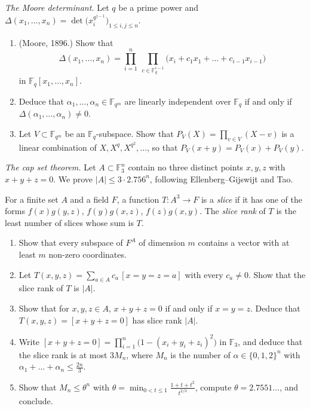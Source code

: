 \begin{exercise}[$\star\star$]\label{pb:moore}
\emph{The Moore determinant.} Let $q$ be a prime power and $\Delta(x_1,\dots,x_n)=\det\bigl(x_i^{q^{j-1}}\bigr)_{1\le i,j\le n}$.
\begin{enumerate}[label=(\alph*)]
\item (Moore, 1896.) Show that
\[
\Delta(x_1,\dots,x_n)=\prod_{i=1}^n\ \prod_{c\in\mathbb F_q^{i-1}}\bigl(x_i+c_1x_1+\dots+c_{i-1}x_{i-1}\bigr)
\]
in $\mathbb F_q[x_1,\dots,x_n]$.
\item Deduce that $\alpha_1,\dots,\alpha_n\in\mathbb F_{q^m}$ are linearly independent over $\mathbb F_q$ if and only if
$\Delta(\alpha_1,\dots,\alpha_n)\ne0$.
\item Let $V\subset\mathbb F_{q^m}$ be an $\mathbb F_q$-subspace. Show that $P_V(X)=\prod_{v\in V}(X-v)$ is a linear combination
of $X,X^q,X^{q^2},\dots$, so that $P_V(x+y)=P_V(x)+P_V(y)$.
\end{enumerate}
\end{exercise}

\begin{exercise}[Journey]\label{pb:capset}
\emph{The cap set theorem.} Let $A\subset\mathbb F_3^n$ contain no three distinct points $x,y,z$ with $x+y+z=0$. We prove
$|A|\le3\cdot2.756^n$, following Ellenberg--Gijswijt and Tao.

For a finite set $A$ and a field $F$, a function $T:A^3\to F$ is a \emph{slice} if it has one of the forms $f(x)g(y,z)$,
$f(y)g(x,z)$, $f(z)g(x,y)$. The \emph{slice rank} of $T$ is the least number of slices whose sum is $T$.
\begin{enumerate}[label=(\alph*)]
\item Show that every subspace of $F^A$ of dimension $m$ contains a vector with at least $m$ non-zero coordinates.
\item Let $T(x,y,z)=\sum_{a\in A}c_a\,[x=y=z=a]$ with every $c_a\ne0$. Show that the slice rank of $T$ is $|A|$.
\item Show that for $x,y,z\in A$, $x+y+z=0$ if and only if $x=y=z$. Deduce that $T(x,y,z)=[x+y+z=0]$ has slice rank $|A|$.
\item Write $[x+y+z=0]=\prod_{i=1}^n\bigl(1-(x_i+y_i+z_i)^2\bigr)$ in $\mathbb F_3$, and deduce that the slice rank is at most $3M_n$,
where $M_n$ is the number of $\alpha\in\{0,1,2\}^n$ with $\alpha_1+\dots+\alpha_n\le\frac{2n}3$.
\item Show that $M_n\le\theta^n$ with $\theta=\min_{0<t\le1}\frac{1+t+t^2}{t^{2/3}}$, compute $\theta=2.7551\ldots$, and
conclude.
\end{enumerate}
\end{exercise}


